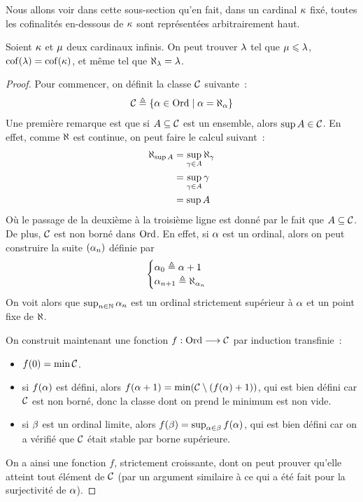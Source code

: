 Nous allons voir dans cette sous-section qu'en fait, dans un cardinal $\kappa$
fixé, toutes les cofinalités en-dessous de $\kappa$ sont représentées
arbitrairement haut.

\begin{proposition}
  Soient $\kappa$ et $\mu$ deux cardinaux infinis. On peut trouver
  $\lambda$ tel que $\mu \leqslant \lambda$, $\operatorname{cof}(\lambda) = \operatorname{cof}(\kappa)$, et
  même tel que $\aleph_\lambda = \lambda$.
\end{proposition}

\begin{proof}
  Pour commencer, on définit la classe $\mathcal{C}$ suivante~:
  \[\mathcal{C} \triangleq \left\{ \alpha \in \operatorname{Ord} \;\middle\vert\; \alpha = \aleph_\alpha \right\}\]
  Une première remarque est que si $A\subseteq \mathcal{C}$ est un ensemble,
  alors $\sup A \in \mathcal{C}$. En effet, comme $\aleph$ est continue, on peut
  faire le calcul suivant~:
  \begin{align*}
    \aleph_{\sup A} &= \sup_{\gamma \in A} \aleph_\gamma\\
    &= \sup_{\gamma \in A} \gamma\\
    &= \sup A
  \end{align*}
  Où le passage de la deuxième à la troisième ligne est donné par le fait que
  $A\subseteq \mathcal{C}$. De plus, $\mathcal{C}$ est non borné dans $\operatorname{Ord}$. En
  effet, si $\alpha$ est un ordinal, alors on peut construire la suite
  $(\alpha_n)$ définie par
  \[\begin{cases}
  \alpha_0 \triangleq \alpha + 1\\
  \alpha_{n+1} \triangleq \aleph_{\alpha_n }
  \end{cases}\]
  On voit alors que $\sup_{n \in \mathbb N} \alpha_n$ est un ordinal strictement
  supérieur à $\alpha$ et un point fixe de $\aleph$.

  On construit maintenant une fonction $f : \displaystyle \operatorname{Ord} \longrightarrow \mathcal{C}$ par
  induction transfinie~:
  \begin{itemize}
  \item $f(0) = \min \mathcal{C}$.
  \item si $f(\alpha)$ est défini, alors
    $f(\alpha + 1) = \min(\mathcal{C} \setminus (f(\alpha) + 1))$, qui est bien
    défini car $\mathcal{C}$ est non borné, donc la classe dont on prend le minimum
    est non vide.
  \item si $\beta$ est un ordinal limite, alors
    $f(\beta) = \sup_{\alpha \in \beta} f(\alpha)$, qui est bien défini car
    on a vérifié que $\mathcal{C}$ était stable par borne supérieure.
  \end{itemize}
  On a ainsi une fonction $f$, strictement croissante, dont on peut prouver
  qu'elle atteint tout élément de $\mathcal{C}$ (par un argument similaire à ce qui a
  été fait pour la surjectivité de $\alpha$).


\end{proof}
